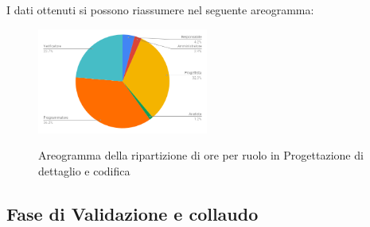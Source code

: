 I dati ottenuti si possono riassumere nel seguente areogramma:
\begin{figure}[H] 
			\centering 
				\includegraphics[width=0.5\textwidth]{res/images/areogramma_dettaglio.png}\\
				\caption{Areogramma della ripartizione di ore per ruolo in Progettazione di dettaglio e codifica}
			\label{AreogrammaDettaglio}
\end{figure}


\subsection{Fase di Validazione e collaudo}
